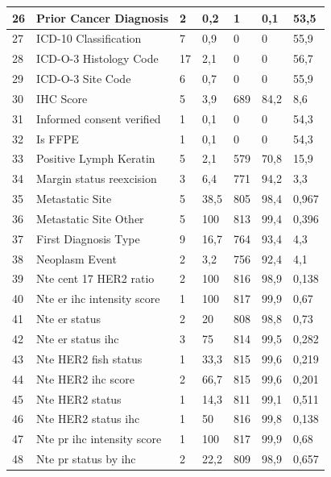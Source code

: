 \begin{table}[!htb]
	\footnotesize
	\centering
	\begin{threeparttable}
		\begin{tabular}{p{0.5cm} p{4cm} p{1.5cm} p{2cm} p{1.5cm} p{2cm} p{1.5cm}} \toprule
			26	&	Prior Cancer Diagnosis	&	2	&	0,2	&	1	&	0,1	&	53,5
			\\ \hline	27	&	ICD-10 Classification	&	7	&	0,9	&	0	&	0	&	55,9
			\\ \hline	28	&	ICD-O-3 Histology Code	&	17	&	2,1	&	0	&	0	&	56,7
			\\ \hline	29	&	ICD-O-3 Site Code	&	6	&	0,7	&	0	&	0	&	55,9
			\\ \hline	30	&	IHC Score	&	5	&	3,9	&	689	&	84,2	&	8,6
			\\ \hline	31	&	Informed consent verified	&	1	&	0,1	&	0	&	0	&	54,3
			\\ \hline	32	&	Is FFPE	&	1	&	0,1	&	0	&	0	&	54,3
			\\ \hline	33	&	Positive Lymph Keratin	&	5	&	2,1	&	579	&	70,8	&	15,9
			\\ \hline	34	&	Margin status reexcision	&	3	&	6,4	&	771	&	94,2	&	3,3
			\\ \hline	35	&	Metastatic Site	&	5	&	38,5	&	805	&	98,4	&	0,967
			\\ \hline	36	&	Metastatic Site Other	&	5	&	100	&	813	&	99,4	&	0,396
			\\ \hline	37	&	First Diagnosis Type	&	9	&	16,7	&	764	&	93,4	&	4,3
			\\ \hline	38	&	Neoplasm Event 	&	2	&	3,2	&	756	&	92,4	&	4,1
			\\ \hline	39	&	Nte cent 17 HER2 ratio	&	2	&	100	&	816	&	98,9	&	0,138
			\\ \hline	40	&	Nte er ihc intensity score	&	1	&	100	&	817	&	99,9	&	0,67
			\\ \hline	41	&	Nte er status	&	2	&	20	&	808	&	98,8	&	0,73
			\\ \hline	42	&	Nte er status ihc 	&	3	&	75	&	814	&	99,5	&	0,282
			\\ \hline	43	&	Nte HER2 fish status	&	1	&	33,3	&	815	&	99,6	&	0,219
			\\ \hline	44	&	Nte HER2 ihc score	&	2	&	66,7	&	815	&	99,6	&	0,201
			\\ \hline	45	&	Nte HER2 status	&	1	&	14,3	&	811	&	99,1	&	0,511
			\\ \hline	46	&	Nte HER2 status ihc 	&	1	&	50	&	816	&	99,8	&	0,138
			\\ \hline	47	&	Nte pr ihc intensity score	&	1	&	100	&	817	&	99,9	&	0,68
			\\ \hline	48	&	Nte pr status by ihc	&	2	&	22,2	&	809	&	98,9	&	0,657

\end{tabular}
\end{threeparttable}
\end{table}
